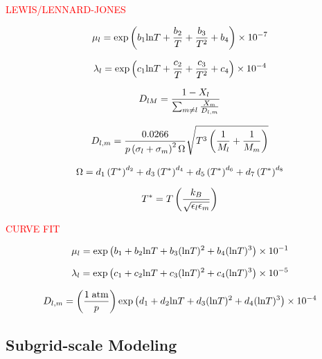 \textcolor{red}{LEWIS/LENNARD-JONES}

\begin{equation}
	\mu_{l} = \text{exp} \left(b_1 \text{ln} T + \frac{b_2}{T} + \frac{b_3}{T^2} + b_4 \right) \times 10^{-7}
\end{equation}

\begin{equation}
	\lambda_{l} = \text{exp} \left(c_1 \text{ln} T + \frac{c_2}{T} + \frac{c_3}{T^2} + c_4 \right) \times 10^{-4}
\end{equation}

\begin{equation}
	D_{l M} = \frac{1 - X_{l}}{\sum_{m \neq l} \frac{X_{m}}{D_{l, m}}}
\end{equation}

\begin{equation}
	D_{l, m} = \frac{0.0266}{p \left(\sigma_{l} + \sigma_{m}\right)^2 \Omega} \sqrt{T^3 \left(\frac{1}{M_{l}} + \frac{1}{M_{m}}\right)}
\end{equation}

\begin{equation}
	\Omega = d_1 \left(T^*\right)^{d_2} + d_3 \left(T^*\right)^{d_4} + d_5 \left(T^*\right)^{d_6} +  d_7 \left(T^*\right)^{d_8}
\end{equation}

\begin{equation}
	T^* = T \left( \frac{k_B}{\sqrt{\epsilon_{l} \epsilon_{m}}} \right)
\end{equation}

\textcolor{red}{CURVE FIT}

\begin{equation}
	\mu_{l} = \text{exp} \left( b_1 + b_2 \text{ln}T + b_3 (\text{ln}T)^2 + b_4 (\text{ln}T)^3  \right) \times 10^{-1}
\end{equation}

\begin{equation}
	\lambda_{l} = \text{exp} \left( c_1 + c_2 \text{ln}T + c_3 (\text{ln}T)^2 + c_4 (\text{ln}T)^3  \right) \times 10^{-5}
\end{equation}

\begin{equation}
	D_{l, m} = \left(\frac{1 \; \text{atm}}{p}\right) \text{exp} \left( d_1 + d_2 \text{ln}T + d_3 (\text{ln}T)^2 + d_4 (\text{ln}T)^3 \right) \times 10^{-4}
\end{equation}

\subsection{Subgrid-scale Modeling}